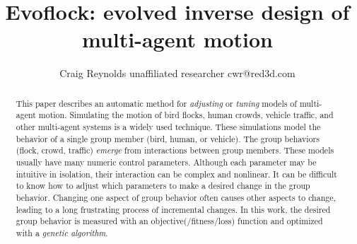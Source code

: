 \documentclass[letterpaper]{article}
\begin{document}
\title{Evoflock: evolved inverse design of multi-agent motion}

\author{Craig Reynolds\authorcr
    unaffiliated researcher\authorcr 
    cwr@red3d.com}


\captionsetup{hypcap=false}


\date{}

\maketitle



\begin{abstract}
    This paper describes an automatic method for \textit{adjusting} or \textit{tuning} models of multi-agent motion. Simulating the motion of bird flocks, human crowds, vehicle traffic, and other multi-agent systems is a widely used technique. These simulations model the behavior of a single group member (bird, human, or vehicle). The group behaviors (flock, crowd, traffic) \textit{emerge} from interactions between group members. These models usually have many numeric control parameters. Although each parameter may be intuitive in isolation, their interaction can be complex and nonlinear. It can be difficult to know how to adjust which parameters to make a desired change in the group behavior. Changing one aspect of group behavior often causes other aspects to change, leading to a long frustrating process of incremental changes. In this work, the desired group behavior is measured with an objective(/fitness/loss) function and optimized with a \textit{genetic algorithm}.
\end{abstract}
\end{document}
